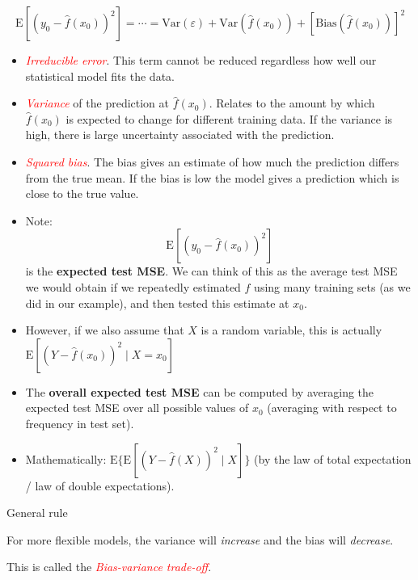 \documentclass[
  ignorenonframetext,
]{beamer}
\begin{document}
\begin{frame}
\[\text{E}[(y_0 - \hat{f}(x_0))^2]=\cdots=\text{Var}(\varepsilon) +  \text{Var}(\hat{f}(x_0))+[\text{Bias}(\hat{f}(x_0))]^2\]

\begin{itemize}
\item
  \emph{\textcolor{red}{Irreducible error}}. This term cannot be reduced
  regardless how well our statistical model fits the data.
\item
  \emph{\textcolor{red}{Variance}} of the prediction at
  \(\hat{f}(x_0)\). Relates to the amount by which \(\hat{f}(x_0)\) is
  expected to change for different training data. If the variance is
  high, there is large uncertainty associated with the prediction.
\item
  \emph{\textcolor{red}{Squared bias}}. The bias gives an estimate of
  how much the prediction differs from the true mean. If the bias is low
  the model gives a prediction which is close to the true value.
\end{itemize}
\end{frame}

\begin{frame}
\begin{itemize}
\item
  Note: \[\text{E}[(y_0 - \hat{f}(x_0))^2]\] is the \textbf{expected
  test MSE}. We can think of this as the average test MSE we would
  obtain if we repeatedly estimated \(f\) using many training sets (as
  we did in our example), and then tested this estimate at \(x_0\).
\item
  However, if we also assume that \(X\) is a random variable, this is
  actually \(\text{E}[(Y - \hat{f}(x_0))^2 \mid X=x_0]\)
\item
  The \textbf{overall expected test MSE} can be computed by averaging
  the expected test MSE over all possible values of \(x_0\) (averaging
  with respect to frequency in test set).
\item
  Mathematically: \(\text{E} \{ \text{E}[(Y - \hat{f}(X))^2 \mid X]\}\)
  (by the law of total expectation / law of double expectations).
\end{itemize}
\end{frame}

\begin{frame}
\begin{block}{General rule}
\protect\hypertarget{general-rule}{}
\vspace{4mm}

For more flexible models, the variance will \emph{increase} and the bias
will \emph{decrease}.

\vspace{4mm}

\centering

This is called the \emph{\textcolor{red}{Bias-variance trade-off}}.
\end{block}
\end{frame}
\end{document}
